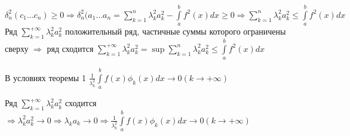 \begin{Proof}
	$\delta_n^2 (c_1 \dots c_n) \geq 0 \Rightarrow \delta_n^2 (a_1 \dots a_n = \sum\limits_{k=1}^{n}\lambda_k^2 a_k^2 - \int\limits_{a}^{b}f^2(x)dx \geq 0 \Rightarrow \sum\limits_{k=1}^{n}\lambda_k^2 a_k^2 \leq \int\limits_{a}^{b}f^2(x)dx$\\
	Ряд $\sum\limits_{k=1}^{+\infty}\lambda_k^2 a_k^2$ положительный ряд, частичные суммы которого ограничены сверху  $\Rightarrow$ ряд сходится $\sum\limits_{k=1}^{+\infty}\lambda_k^2 a_k^2 = \sup\sum\limits_{k=1}^{n}\lambda_k^2 a_k^2 \leq \int\limits_{a}^{b}f^2(x)dx$
\end{Proof}

\begin{Seq}
	В условиях теоремы 1 $\frac{1}{\lambda_k^2}\int\limits_{a}^{b}f(x)\phi_k(x)dx \rightarrow 0 (k \rightarrow +\infty)$
\end{Seq}

\begin{Proof}
	Ряд $\sum\limits_{k=1}^{+\infty}\lambda_k^2 a_k^2$ сходится $\Rightarrow \lambda_k^2 a_k^2 \rightarrow 0 \Rightarrow \lambda_k a_k \rightarrow 0 \Rightarrow \frac{1}{\lambda_k^2}\int\limits_{a}^{b}f(x)\phi_k(x)dx \rightarrow 0 (k \rightarrow +\infty)$
\end{Proof}